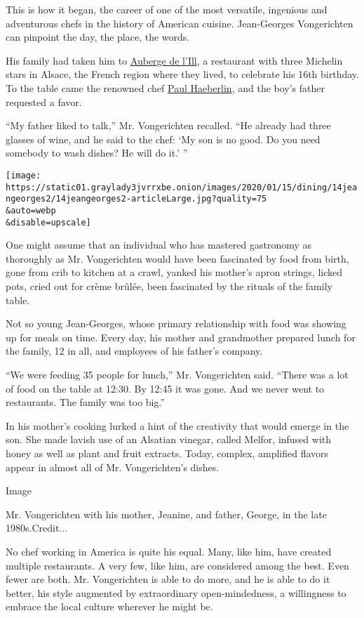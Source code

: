 This is how it began, the career of one of the most versatile, ingenious
and adventurous chefs in the history of American cuisine. Jean-Georges
Vongerichten can pinpoint the day, the place, the words.

His family had taken him to
\href{https://www.auberge-de-l-ill.com/fr/}{Auberge de l'Ill}, a
restaurant with three Michelin stars in Alsace, the French region where
they lived, to celebrate his 16th birthday. To the table came the
renowned chef
\href{https://www.nytimes3xbfgragh.onion/2008/05/13/world/europe/13haeberlin.html}{Paul
Haeberlin}, and the boy's father requested a favor.

``My father liked to talk,'' Mr. Vongerichten recalled. ``He already had
three glasses of wine, and he said to the chef: `My son is no good. Do
you need somebody to wash dishes? He will do it.' ''

\texttt{[image: https://static01.graylady3jvrrxbe.onion/images/2020/01/15/dining/14jeangeorges2/14jeangeorges2-articleLarge.jpg?quality=75\\\&auto=webp\\\&disable=upscale]}

One might assume that an individual who has mastered gastronomy as
thoroughly as Mr. Vongerichten would have been fascinated by food from
birth, gone from crib to kitchen at a crawl, yanked his mother's apron
strings, licked pots, cried out for crème brûlée, been fascinated by the
rituals of the family table.

Not so young Jean-Georges, whose primary relationship with food was
showing up for meals on time. Every day, his mother and grandmother
prepared lunch for the family, 12 in all, and employees of his father's
company.

``We were feeding 35 people for lunch,'' Mr. Vongerichten said. ``There
was a lot of food on the table at 12:30. By 12:45 it was gone. And we
never went to restaurants. The family was too big.''

In his mother's cooking lurked a hint of the creativity that would
emerge in the son. She made lavish use of an Alsatian vinegar, called
Melfor, infused with honey as well as plant and fruit extracts. Today,
complex, amplified flavors appear in almost all of Mr. Vongerichten's
dishes.

Image

Mr. Vongerichten with his mother, Jeanine, and father, George, in the
late 1980s.Credit...

No chef working in America is quite his equal. Many, like him, have
created multiple restaurants. A very few, like him, are considered among
the best. Even fewer are both. Mr. Vongerichten is able to do more, and
he is able to do it better, his style augmented by extraordinary
open-mindedness, a willingness to embrace the local culture wherever he
might be.

